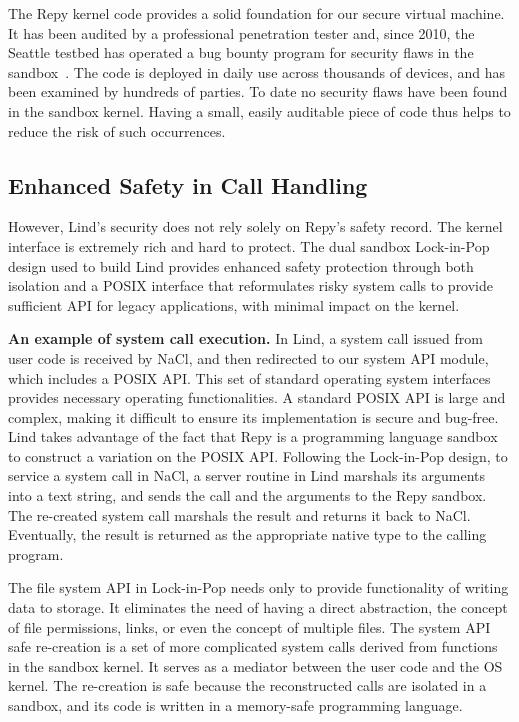 The Repy kernel code provides a solid foundation for our secure virtual
machine. It has been audited by a professional penetration tester and, since 2010,
the Seattle testbed has operated a bug bounty program for security flaws in the
sandbox~\cite{seattle}.
The code is deployed in daily use across thousands of devices, and has been examined by
hundreds of parties. To date no security flaws have been found in the sandbox
kernel. Having a small, easily auditable piece of code thus helps to reduce the
risk of such occurrences.

\subsection{Enhanced Safety in Call Handling}

However, Lind's security does not rely solely on Repy's
safety record.
The kernel interface is extremely rich and hard to protect.
The dual sandbox Lock-in-Pop design used to build Lind provides enhanced
safety protection through both isolation and a POSIX interface that
reformulates risky system calls to
provide sufficient API for legacy applications, with minimal impact on the kernel.

\textbf{An example of system call execution.}
In Lind, a system call issued from user code is
received by NaCl, and then redirected to our system API module, which
includes a POSIX API. This set of standard
operating system interfaces provides
necessary operating functionalities. A standard POSIX API is large and complex,
making it difficult to ensure its implementation is secure and bug-free.
Lind takes advantage of the fact that Repy is a programming language sandbox to
construct a variation on the POSIX API. Following the
Lock-in-Pop design, to service a system call in NaCl, a server routine in
Lind marshals its arguments into a text string, and sends the call and the arguments
to the Repy sandbox. The re-created system call marshals the result and
returns it back to NaCl. Eventually, the result is returned as the appropriate
native type to the calling program.

The file system API in Lock-in-Pop needs only
to provide functionality of writing data to storage.
It eliminates the need of having a direct abstraction, the
concept of file permissions, links, or even the concept of multiple files.
The system API safe re-creation is a set of more complicated system calls
derived from functions in the sandbox kernel.
It serves as a mediator between the user code
and the OS kernel. The re-creation is safe
because the reconstructed calls are isolated in a sandbox, and its code is written
 in a memory-safe programming language.

